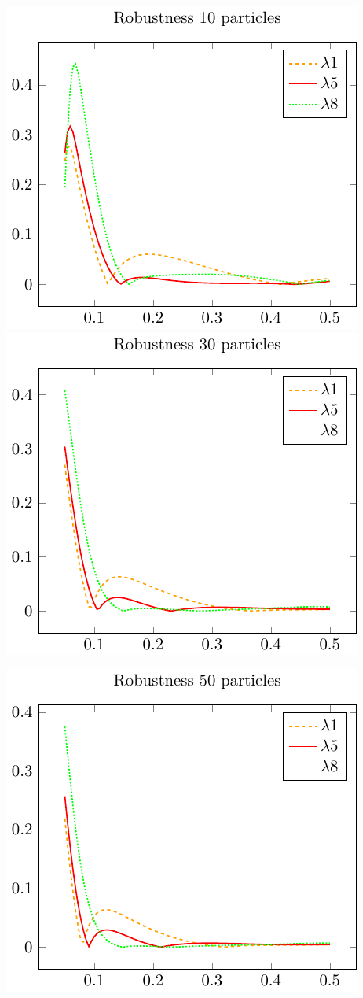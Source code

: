 \includegraphics{./gfx/robustness_compare10.pdf}
\includegraphics{./gfx/robustness_compare30.pdf}

\centering
\includegraphics{./gfx/robustness_compare50.pdf}
